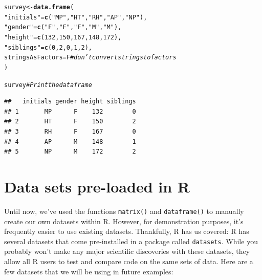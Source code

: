 \documentclass{tufte-book}\usepackage[]{graphicx}\usepackage[]{color}
\makeatletter
\newcommand{\hlnum}[1]{\textcolor[rgb]{0.686,0.059,0.569}{#1}}%
\newcommand{\hlstr}[1]{\textcolor[rgb]{0.192,0.494,0.8}{#1}}%
\newcommand{\hlcom}[1]{\textcolor[rgb]{0.678,0.584,0.686}{\textit{#1}}}%
\newcommand{\hlstd}[1]{\textcolor[rgb]{0.345,0.345,0.345}{#1}}%
\newcommand{\hlkwb}[1]{\textcolor[rgb]{0.69,0.353,0.396}{#1}}%
\newcommand{\hlkwc}[1]{\textcolor[rgb]{0.333,0.667,0.333}{#1}}%
\newcommand{\hlkwd}[1]{\textcolor[rgb]{0.737,0.353,0.396}{\textbf{#1}}}%
\newenvironment{kframe}{%
 \def\at@end@of@kframe{}%
 \ifinner\ifhmode%
  \def\at@end@of@kframe{\end{minipage}}%
  \begin{minipage}{\columnwidth}%
 \fi\fi%
 \def\FrameCommand##1{\hskip\@totalleftmargin \hskip-\fboxsep
 \colorbox{shadecolor}{##1}\hskip-\fboxsep
     \hskip-\linewidth \hskip-\@totalleftmargin \hskip\columnwidth}%
 \MakeFramed {\advance\hsize-\width
   \@totalleftmargin\z@ \linewidth\hsize
   \@setminipage}}%
 {\par\unskip\endMakeFramed%
 \at@end@of@kframe}
\newenvironment{knitrout}{}{} %
\makeatother
\begin{document}
\begin{footnotesize}
\begin{knitrout}
\color{fgcolor}\begin{kframe}
\begin{alltt}
\hlstd{survey} \hlkwb{<-} \hlkwd{data.frame}\hlstd{(}
          \hlstr{"initials"} \hlstd{=} \hlkwd{c}\hlstd{(}\hlstr{"MP"}\hlstd{,} \hlstr{"HT"}\hlstd{,} \hlstr{"RH"}\hlstd{,} \hlstr{"AP"}\hlstd{,} \hlstr{"NP"}\hlstd{),}
           \hlstr{"gender"} \hlstd{=} \hlkwd{c}\hlstd{(}\hlstr{"F"}\hlstd{,} \hlstr{"F"}\hlstd{,} \hlstr{"F"}\hlstd{,} \hlstr{"M"}\hlstd{,} \hlstr{"M"}\hlstd{),}
           \hlstr{"height"} \hlstd{=} \hlkwd{c}\hlstd{(}\hlnum{132}\hlstd{,} \hlnum{150}\hlstd{,} \hlnum{167}\hlstd{,} \hlnum{148}\hlstd{,} \hlnum{172}\hlstd{),}
           \hlstr{"siblings"} \hlstd{=} \hlkwd{c}\hlstd{(}\hlnum{0}\hlstd{,} \hlnum{2}\hlstd{,} \hlnum{0}\hlstd{,} \hlnum{1}\hlstd{,} \hlnum{2}\hlstd{),}
           \hlkwc{stringsAsFactors} \hlstd{= F} \hlcom{# don't convert strings to factors}
          \hlstd{)}

\hlstd{survey} \hlcom{# Print the dataframe}
\end{alltt}
\begin{verbatim}
##   initials gender height siblings
## 1       MP      F    132        0
## 2       HT      F    150        2
## 3       RH      F    167        0
## 4       AP      M    148        1
## 5       NP      M    172        2
\end{verbatim}
\end{kframe}
\end{knitrout}
\end{footnotesize}


\section{Data sets pre-loaded in R}

Until now, we've used the functions \texttt{matrix()} and \texttt{dataframe()} to manually create our own datasets within R. However, for demonstration purposes, it's frequently easier to use existing datasets. Thankfully, R has us covered: R has several datasets that come pre-installed in a package called \texttt{datasets}. While you probably won't make any major scientific discoveries with these datasets, they allow all R users to test and compare code on the same sets of data. Here are a few datasets that we will be using in future examples:
\end{document}
